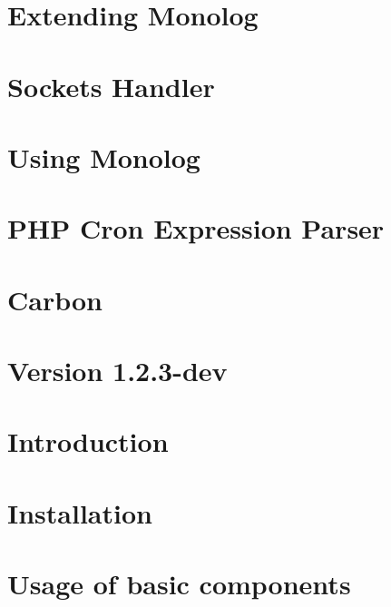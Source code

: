\documentclass[twoside]{book}
\newcommand{\+}{\discretionary{\mbox{\scriptsize$\hookleftarrow$}}{}{}}
\begin{document}
\chapter{Extending Monolog}
\label{md_vendor_monolog_monolog_doc_extending}

\chapter{Sockets Handler}
\label{md_vendor_monolog_monolog_doc_sockets}

\chapter{Using Monolog}
\label{md_vendor_monolog_monolog_doc_usage}

\chapter{P\+H\+P Cron Expression Parser}
\label{md_vendor_mtdowling_cron-expression__r_e_a_d_m_e}

\chapter{Carbon}
\label{md_vendor_nesbot_carbon_readme}

\chapter{Version 1.2.3-\/dev}
\label{md_vendor_nikic_php-parser__c_h_a_n_g_e_l_o_g}

\chapter{Introduction}
\label{md_vendor_nikic_php-parser_doc_0__introduction}

\chapter{Installation}
\label{md_vendor_nikic_php-parser_doc_1__installation}

\chapter{Usage of basic components}
\label{md_vendor_nikic_php-parser_doc_2__usage_of_basic_components}

\end{document}
